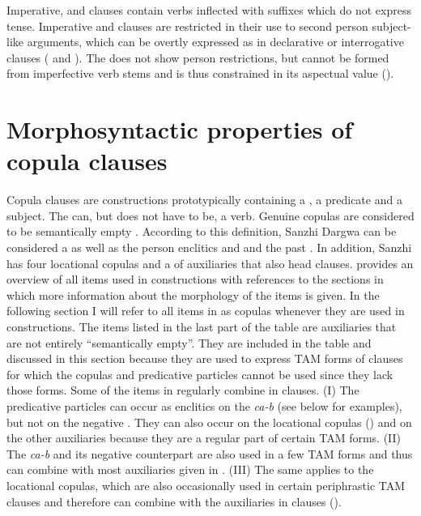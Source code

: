 \hspace*{-1.69814pt}Imperative,  and  clauses contain verbs inflected with suffixes which do not express tense. Imperative and  clauses are restricted in their use to second person subject-like arguments, which can be overtly expressed as in declarative or interrogative clauses ( and ). The  does not show person restrictions, but cannot be formed from imperfective verb stems and is thus constrained in its aspectual value ().




\section{Morphosyntactic properties of copula clauses}\label{sec:copulaclauses}
\largerpage

Copula clauses are constructions prototypically containing a , a  predicate and a  subject. The  can, but does not have to be, a verb. Genuine copulas are considered to be semantically empty \citep[5]{Pustet2005}. According to this definition, Sanzhi Dargwa  can be considered a  as well as the person enclitics  and  and the past  . In addition, Sanzhi has four locational copulas and a  of auxiliaries that also head  clauses.  provides an overview of all items used in  constructions with references to the sections in which more information about the morphology of the items is given. In the following section I will refer to all items in  as copulas whenever they are used in  constructions. The items listed in the last part of the table are auxiliaries that are not entirely ``semantically empty''. They are included in the table and discussed in this section because they are used to express TAM forms of  clauses for which the copulas and predicative particles cannot be used since they lack those forms. Some of the items in  regularly combine in  clauses. (I) The predicative particles can occur as enclitics on the  \textit{ca-b} (see below for examples), but not on the negative . They can also occur on the locational copulas () and on the other auxiliaries because they are a regular part of certain TAM forms. (II) The  \textit{ca-b} and its negative counterpart are also used in a few TAM forms and thus can combine with most auxiliaries given in  . (III) The same applies to the locational copulas, which are also occasionally used in certain periphrastic TAM clauses and therefore can combine with the auxiliaries in  clauses ().

